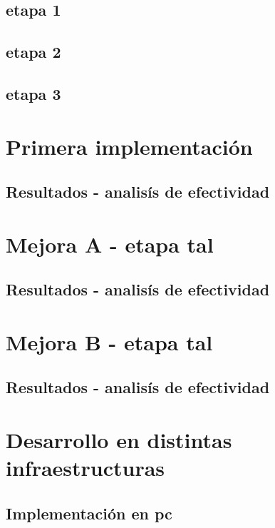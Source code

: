 \documentclass[conference]{IEEEtran}
\begin{document}
\subsection{etapa 1}

\subsection{etapa 2}

\subsection{etapa 3}

\section{Primera implementación}

\subsection{Resultados - analisís de efectividad}

\section{Mejora A - etapa tal}

\subsection{Resultados - analisís de efectividad}

\section{Mejora B - etapa tal}

\subsection{Resultados - analisís de efectividad}

\section{Desarrollo en distintas infraestructuras}

\subsection{Implementación en pc}
\end{document}
